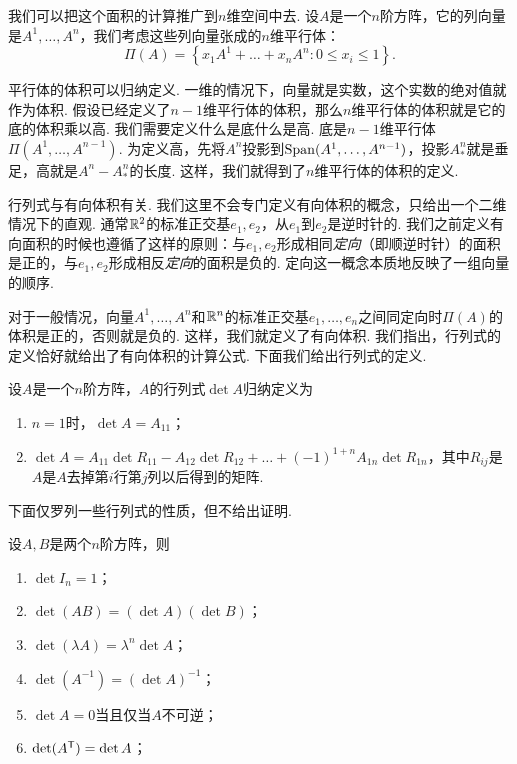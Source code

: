 我们可以把这个面积的计算推广到$n$维空间中去. 设$A$是一个$n$阶方阵，它的列向量是$A^1,\dots,A^n$，我们考虑这些列向量张成的$n$维平行体：
\[\Pi(A)=\left\{x_1A^1+\dots+x_nA^n:0\leq x_i\leq 1\right\}.\]

平行体的体积可以归纳定义. 一维的情况下，向量就是实数，这个实数的绝对值就作为体积. 假设已经定义了$n-1$维平行体的体积，那么$n$维平行体的体积就是它的底的体积乘以高. 我们需要定义什么是底什么是高. 底是$n-1$维平行体$\Pi(A^1,\dots,A^{n-1})$. 为定义高，先将$A^n$投影到$\operatorname*{Span}(A^1,\dots,A^{n-1})$，投影$A^n_*$就是垂足，高就是$A^n-A^n_*$的长度. 这样，我们就得到了$n$维平行体的体积的定义. 

行列式与有向体积有关. 我们这里不会专门定义有向体积的概念，只给出一个二维情况下的直观. 通常$\mathbb{R}^2$的标准正交基$e_1,e_2$，从$e_1$到$e_2$是逆时针的. 我们之前定义有向面积的时候也遵循了这样的原则：与$e_1,e_2$形成相同\textit{定向}（即顺逆时针）的面积是正的，与$e_1,e_2$形成相反\textit{定向}的面积是负的. 定向这一概念本质地反映了一组向量的顺序. 

对于一般情况，向量$A^1,\dots,A^n$和$\mathbb{R}^n$的标准正交基$e_1,\dots,e_n$之间同定向时$\Pi(A)$的体积是正的，否则就是负的. 这样，我们就定义了有向体积. 我们指出，行列式的定义恰好就给出了有向体积的计算公式. 下面我们给出行列式的定义. 

\begin{definition}[行列式]
    设$A$是一个$n$阶方阵，$A$的行列式$\det A$归纳定义为
\begin{enumerate}
    \item $n=1$时，$\det A=A_{11}$；
    \item $\det A=A_{11}\det R_{11}-A_{12}\det R_{12}+\dots+(-1)^{1+n}A_{1n}\det R_{1n}$，其中$R_{ij}$是$A$是$A$去掉第$i$行第$j$列以后得到的矩阵. 
\end{enumerate}
\end{definition}

下面仅罗列一些行列式的性质，但不给出证明. 

\begin{proposition}\label{prop:determinant}
    设$A,B$是两个$n$阶方阵，则
    \begin{enumerate}
        \item $\det I_n=1$；
        \item $\det(AB)=(\det A)(\det B)$；
        \item $\det(\lambda A)=\lambda^n\det A$；
        \item $\det(A^{-1})=(\det A)^{-1}$；
        \item $\det A=0$当且仅当$A$不可逆；
        \item $\det(A^{\mathsf{T}})=\det A$；
    \end{enumerate}
\end{proposition}

